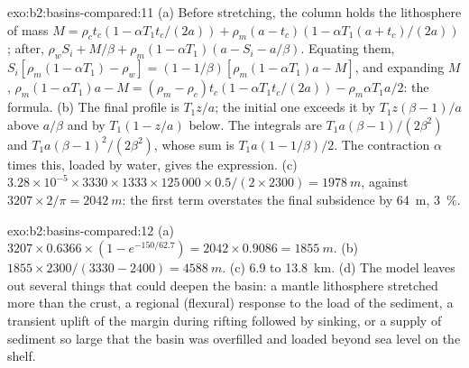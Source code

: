 \begin{solution}{exo:b2:basins-compared:11}
(a) Before stretching, the column holds the lithosphere of mass $M = \rho_c t_c(1 - \alpha T_1
t_c/(2a)) + \rho_m(a - t_c)(1 - \alpha T_1(a + t_c)/(2a))$; after, $\rho_w S_i + M/\beta +
\rho_m(1 - \alpha T_1)(a - S_i - a/\beta)$. Equating them, $S_i[\rho_m(1 - \alpha T_1) - \rho_w] =
(1 - 1/\beta)[\rho_m(1 - \alpha T_1)a - M]$, and expanding $M$, $\rho_m(1 - \alpha T_1)a - M =
(\rho_m - \rho_c)t_c(1 - \alpha T_1 t_c/(2a)) - \rho_m\alpha T_1 a/2$: the formula. (b) The final profile is $T_1 z/a$; the initial one exceeds it
by $T_1 z(\beta - 1)/a$ above $a/\beta$ and by $T_1(1 - z/a)$ below. The integrals are $T_1
a(\beta - 1)/(2\beta^2)$ and $T_1 a(\beta - 1)^2/(2\beta^2)$, whose sum is $T_1 a(1 - 1/\beta)/2$.
The contraction $\alpha$ times this, loaded by water, gives the expression. (c) $3.28\times10^{-5}
\times3330\times1333\times125\,000\times0.5/(2\times2300) = \qty{1978}{m}$, against $3207\times
2/\pi = \qty{2042}{m}$: the first term overstates the final subsidence by \qty{64}{m},
\qty{3}{\percent}.
\end{solution}

\begin{solution}{exo:b2:basins-compared:12}
(a) $3207\times0.6366\times(1 - e^{-150/62.7}) = 2042\times0.9086 = \qty{1855}{m}$. (b) $1855\times
2300/(3330 - 2400) = \qty{4588}{m}$. (c) 6.9 to \qty{13.8}{km}. (d) The model leaves out several
things that could deepen the basin: a mantle lithosphere stretched more than the crust, a regional
(flexural) response to the load of the sediment, a transient uplift of the margin during rifting
followed by sinking, or a supply of sediment so large that the basin was overfilled and loaded
beyond sea level on the shelf.
\end{solution}

